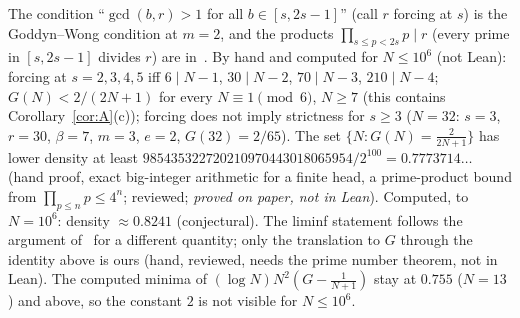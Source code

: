\documentclass[11pt]{article}
\theoremstyle{definition}
\theoremstyle{remark}
\begin{document}
The condition ``$\gcd(b,r)>1$ for all $b\in[s,2s-1]$'' (call $r$ forcing at $s$) is the Goddyn--Wong condition at $m=2$, and the products $\prod_{s\le p<2s}p\mid r$ (every prime in $[s,2s-1]$ divides $r$) are in~\cite[Thm.~4.1, Table~1]{GW}. By hand and computed for $N\le10^6$ (not Lean): forcing at $s=2,3,4,5$ iff $6\mid N-1$, $30\mid N-2$, $70\mid N-3$, $210\mid N-4$; $G(N)<2/(2N+1)$ for every $N\equiv1\pmod6$, $N\ge7$ (this contains Corollary~\ref{cor:A}(c)); forcing does not imply strictness for $s\ge3$ ($N=32$: $s=3$, $r=30$, $\beta=7$, $m=3$, $e=2$, $G(32)=2/65$). The set $\{N:G(N)=\frac2{2N+1}\}$ has lower density at least $985435322720210970443018065954/2^{100}=0.7773714\ldots$ (hand proof, exact big-integer arithmetic for a finite head, a prime-product bound from $\prod_{p\le n}p\le4^n$; reviewed; \emph{proved on paper, not in Lean}). Computed, to $N=10^6$: density $\approx0.8241$ (conjectural). The liminf statement follows the argument of~\cite[Section~4 and Thm.~1.4]{Z} for a different quantity; only the translation to $G$ through the identity above is ours (hand, reviewed, needs the prime number theorem, not in Lean). The computed minima of $(\log N)N^2(G-\frac1{N+1})$ stay at $0.755$ ($N=13$) and above, so the constant $2$ is not visible for $N\le10^6$.
\end{document}

